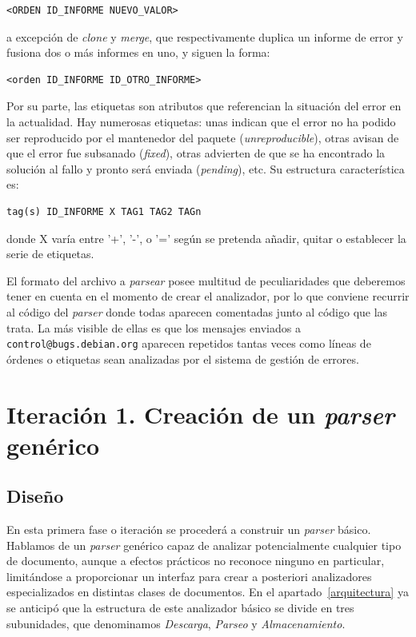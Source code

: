 {\footnotesize \begin{verbatim}<ORDEN ID_INFORME NUEVO_VALOR>\end{verbatim}}

a excepción de \textit{clone} y \textit{merge},
que respectivamente duplica un informe de error y fusiona dos o más informes
en uno, y siguen la forma:

{\footnotesize \begin{verbatim}<orden ID_INFORME ID_OTRO_INFORME>\end{verbatim}}

Por su parte, las etiquetas son atributos que referencian la situación del
error en la actualidad. Hay numerosas etiquetas: unas indican que el error
no ha podido ser reproducido por el mantenedor del paquete
(\textit{unreproducible}), otras avisan de que el error fue subsanado
(\textit{fixed}), otras advierten de que se ha encontrado la solución al fallo
y pronto será enviada (\textit{pending}), etc. Su estructura característica
es:

{\footnotesize \begin{verbatim}tag(s) ID_INFORME X TAG1 TAG2 TAGn\end{verbatim}}

donde X varía entre '+', '-', o '=' según se pretenda añadir, quitar o establecer
la serie de etiquetas.

El formato del archivo a \textit{parsear} posee multitud de peculiaridades que
deberemos tener en cuenta en el momento de crear el analizador, por lo que
conviene recurrir al código del \textit{parser}
donde todas aparecen comentadas junto al código que las trata.
La más visible de ellas es que los mensajes enviados a
\texttt{control@\-bugs.\-debian.org} aparecen repetidos tantas veces como líneas
de órdenes o etiquetas sean analizadas por el sistema de gestión de errores.



\section{Iteración 1. Creación de un \textit{parser} genérico}


\subsection{Diseño}
En esta primera fase o iteración se procederá a construir un \textit{parser}
básico. Hablamos de un \textit{parser} genérico capaz de analizar potencialmente
cualquier tipo de documento, aunque a efectos prácticos no reconoce ninguno
en particular, limitándose a proporcionar un interfaz para crear a posteriori
analizadores especializados en distintas clases de documentos.
En el apartado~\ref{arquitectura} ya se anticipó que la estructura de este
analizador básico se divide en tres subunidades, que denominamos \textit{Descarga},
\textit{Parseo} y \textit{Almacenamiento}.

